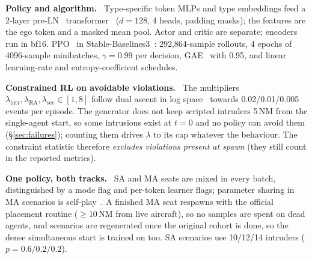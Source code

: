 \documentclass[10pt,twocolumn]{article}
\makeatletter
\renewcommand\section{\@startsection{section}{1}{\z@}{-2ex plus -.5ex minus -.2ex}{1ex plus .2ex}{\normalfont\large\bfseries}}
\renewcommand{\paragraph}[1]{\par\smallskip\noindent\textbf{#1}\ }
\makeatother
\begin{document}
\section{Learning}
\paragraph{Policy and algorithm.} Type-specific token MLPs and type embeddings
feed a 2-layer pre-LN~\citep{xiong2020preln} transformer~\citep{vaswani2017attention} ($d{=}128$, 4 heads, padding masks); the
features are the ego token and a masked mean pool. Actor and critic are
separate; encoders run in bf16. PPO~\citep{schulman2017ppo} in
Stable-Baselines3~\citep{raffin2021sb3}: 292{,}864-sample rollouts, 4 epochs of
4096-sample minibatches, $\gamma{=}0.99$ per decision, GAE~\citep{schulman2016gae}
with 0.95, and linear learning-rate and entropy-coefficient schedules.

\paragraph{Constrained RL on avoidable violations.} The multipliers
$\lambda_\text{intr},\lambda_\text{RA},\lambda_\text{sec}\in[1,8]$ follow dual
ascent in log space~\citep{altman1999cmdp,stooke2020pid} towards 0.02/0.01/0.005
events per episode. The generator does not keep scripted intruders 5\,NM from
the single-agent start, so some intrusions exist at $t{=}0$ and no policy can
avoid them (\S\ref{sec:failures}); counting them drives $\lambda$ to its cap
whatever the behaviour. The constraint statistic therefore \emph{excludes
violations present at spawn} (they still count in the reported metrics).

\paragraph{One policy, both tracks.} SA and MA seats are mixed in every batch,
distinguished by a mode flag and per-token learner flags; parameter sharing in
MA scenarios is self-play~\citep{yu2022mappo,dewitt2020ippo}. A finished MA seat
respawns with the official placement routine ($\ge$10\,NM from live aircraft), so
no samples are spent on dead agents, and scenarios are regenerated once the
original cohort is done, so the dense simultaneous start is trained on too. SA
scenarios use 10/12/14 intruders ($p{=}0.6/0.2/0.2$).
\end{document}
